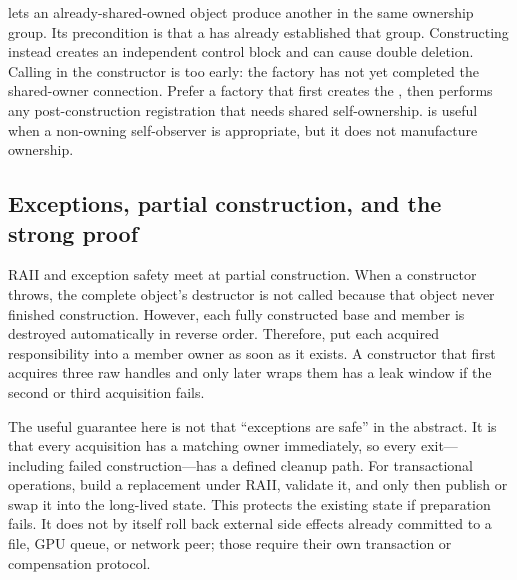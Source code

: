 lets an already-shared-owned object produce another  in the same ownership group. Its precondition is that a  has already established that group. Constructing  instead creates an independent control block and can cause double deletion. Calling  in the constructor is too early: the factory has not yet completed the shared-owner connection. Prefer a factory that first creates the , then performs any post-construction registration that needs shared self-ownership.  is useful when a non-owning self-observer is appropriate, but it does not manufacture ownership.

\subsection{Exceptions, partial construction, and the strong proof}\label{01-foundations-i-ch004-exceptions-partial-construction-and-the-strong-proof}

\hypertarget{01-foundations-i-ch004-exceptions-partial-construction-and-the-strong-proof}{}

RAII and exception safety meet at partial construction. When a constructor throws, the complete object's destructor is not called because that object never finished construction. However, each fully constructed base and member is destroyed automatically in reverse order. Therefore, put each acquired responsibility into a member owner as soon as it exists. A constructor that first acquires three raw handles and only later wraps them has a leak window if the second or third acquisition fails.

The useful guarantee here is not that ``exceptions are safe'' in the abstract. It is that every acquisition has a matching owner immediately, so every exit---including failed construction---has a defined cleanup path. For transactional operations, build a replacement under RAII, validate it, and only then publish or swap it into the long-lived state. This protects the existing state if preparation fails. It does not by itself roll back external side effects already committed to a file, GPU queue, or network peer; those require their own transaction or compensation protocol.


